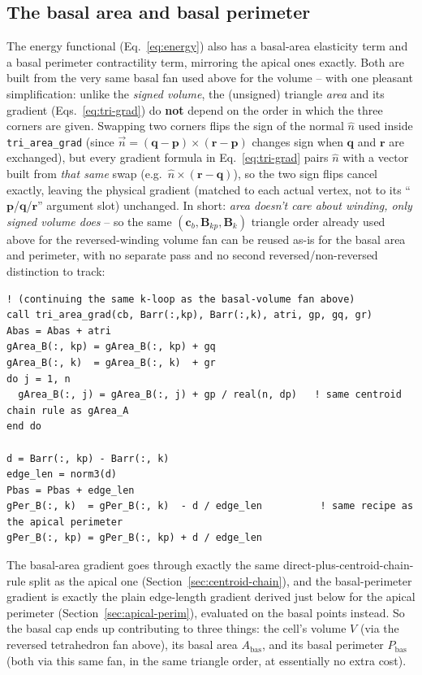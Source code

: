 \documentclass[11pt,a4paper]{report}
\newcommand{\rvec}{\mathbf{r}}
\newcommand{\pvec}{\mathbf{p}}
\newcommand{\qvec}{\mathbf{q}}
\newcommand{\Barr}{\mathbf{B}}
\newcommand{\cb}{\mathbf{c}_b}
\begin{document}
\subsection{The basal area and basal perimeter}
\label{sec:basal-area-perim}
The energy functional (Eq.~\ref{eq:energy}) also has a basal-area
elasticity term and a basal perimeter contractility term, mirroring
the apical ones exactly. Both are built from the very same basal fan
used above for the volume -- with one pleasant simplification: unlike
the \emph{signed volume}, the (unsigned) triangle \emph{area} and its
gradient (Eqs.~\ref{eq:tri-grad}) do \textbf{not} depend on the order
in which the three corners are given. Swapping two corners flips the
sign of the normal $\hat n$ used inside \texttt{tri\_area\_grad} (since
$\vec n=(\qvec-\pvec)\times(\rvec-\pvec)$ changes sign when $\qvec$
and $\rvec$ are exchanged), but every gradient formula in
Eq.~\ref{eq:tri-grad} pairs $\hat n$ with a vector built from
\emph{that same} swap (e.g.\ $\hat n\times(\rvec-\qvec)$), so the two
sign flips cancel exactly, leaving the physical gradient (matched to
each actual vertex, not to its ``$\pvec$/$\qvec$/$\rvec$'' argument
slot) unchanged. In short: \emph{area doesn't care about winding, only
signed volume does} -- so the same $(\cb,\Barr_{kp},\Barr_k)$ triangle
order already used above for the reversed-winding volume fan can be
reused as-is for the basal area and perimeter, with no separate pass
and no second reversed/non-reversed distinction to track:
\begin{lstlisting}
! (continuing the same k-loop as the basal-volume fan above)
call tri_area_grad(cb, Barr(:,kp), Barr(:,k), atri, gp, gq, gr)
Abas = Abas + atri
gArea_B(:, kp) = gArea_B(:, kp) + gq
gArea_B(:, k)  = gArea_B(:, k)  + gr
do j = 1, n
  gArea_B(:, j) = gArea_B(:, j) + gp / real(n, dp)   ! same centroid chain rule as gArea_A
end do

d = Barr(:, kp) - Barr(:, k)
edge_len = norm3(d)
Pbas = Pbas + edge_len
gPer_B(:, k)  = gPer_B(:, k)  - d / edge_len          ! same recipe as the apical perimeter
gPer_B(:, kp) = gPer_B(:, kp) + d / edge_len
\end{lstlisting}
The basal-area gradient goes through exactly the same
direct-plus-centroid-chain-rule split as the apical one
(Section~\ref{sec:centroid-chain}), and the basal-perimeter gradient is
exactly the plain edge-length gradient derived just below for the
apical perimeter (Section~\ref{sec:apical-perim}), evaluated on the
basal points instead. So the basal cap ends up contributing to three things: the
cell's volume $V$ (via the reversed tetrahedron fan above), its basal
area $A_{\mathrm{bas}}$, and its basal perimeter $P_{\mathrm{bas}}$
(both via this same fan, in the same triangle order, at essentially no
extra cost).
\end{document}
